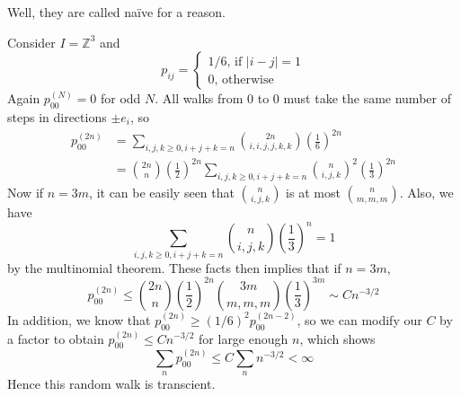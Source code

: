Well, they are called na\"ive for a reason.
\begin{example}
    Consider $I=\mathbb Z^3$ and
    $$p_{ij}=\begin{cases}
        1/6\text{, if $|i-j|=1$}\\
        0\text{, otherwise}
    \end{cases}$$
    Again $p_{00}^{(N)}=0$ for odd $N$.
    All walks from $0$ to $0$ must take the same number of steps in directions $\pm e_i$, so
    \begin{align*}
        p_{00}^{(2n)}&=\sum_{i,j,k\ge 0,i+j+k=n}\binom{2n}{i,i,j,j,k,k}\left( \frac{1}{6} \right)^{2n}\\
        &=\binom{2n}{n}\left(\frac{1}{2} \right)^{2n}\sum_{i,j,k\ge 0,i+j+k=n}\binom{n}{i,j,k}^2\left( \frac{1}{3} \right)^{2n}
    \end{align*}
    Now if $n=3m$, it can be easily seen that $\binom{n}{i,j,k}$ is at most $\binom{n}{m,m,m}$.
    Also, we have
    $$\sum_{i,j,k\ge 0,i+j+k=n}\binom{n}{i,j,k}\left( \frac{1}{3} \right)^n=1$$
    by the multinomial theorem.
    These facts then implies that if $n=3m$,
    $$p_{00}^{(2n)}\le\binom{2n}{n}\left( \frac{1}{2} \right)^{2n}\binom{3m}{m,m,m}\left( \frac{1}{3} \right)^{3m}\sim Cn^{-3/2}$$
    In addition, we know that $p_{00}^{(2n)}\ge (1/6)^2p_{00}^{(2n-2)}$, so we can modify our $C$ by a factor to obtain $p_{00}^{(2n)}\le Cn^{-3/2}$ for large enough $n$, which shows
    $$\sum_{n}p_{00}^{(2n)}\le C\sum_{n}n^{-3/2}<\infty$$
    Hence this random walk is transcient.
\end{example}